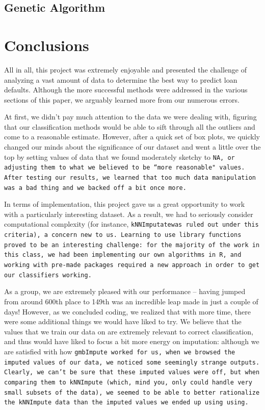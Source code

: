 \documentclass[11pt, oneside]{article}   	%
\begin{document}
	\subsection{Genetic Algorithm}
\section{Conclusions}
	All in all, this project was extremely enjoyable and presented the challenge of analyzing a vast amount of data to determine the best way to predict loan defaults. Although the more successful methods were addressed in the various sections of this paper, we arguably learned more from our numerous errors.
	
	At first, we didn't pay much attention to the data we were dealing with, figuring that our classification methods would be able to sift through all the outliers and come to a reasonable estimate. However, after a quick set of box plots, we quickly changed our minds about the significance of our dataset and went a little over the top by setting values of data that we found moderately sketchy to \tt NA\rm, or adjusting them to what we believed to be ``more reasonable" values. After testing our results, we learned that too much data manipulation was a bad thing and we backed off a bit once more.
	
	
	In terms of implementation, this project gave us a great opportunity to work with a particularly interesting dataset. As a result, we had to seriously consider computational complexity (for instance, \tt kNNImputate\rm was ruled out under this criteria), a concern new to us. Learning to use  library functions proved to be an interesting challenge: for the majority of the work in this class, we had been implementing our own algorithms in R, and working with pre-made packages required a new approach in order to get our classifiers working.
	
		As a group, we are extremely pleased with our performance -- having jumped from around 600th place to 149th was an incredible leap made in just a couple of days! However, as we concluded coding, we realized that with more time, there were some additional things we would have liked to try. We believe that the values that we train our data on are extremely relevant to correct classification, and thus would have liked to focus a bit more energy on imputation: although we are satisfied with how \tt gmbImpute\rm~worked for us, when we browsed the imputed values of our data, we noticed some seemingly strange outputs. Clearly, we can't be sure that these imputed values were off, but when comparing them to \tt kNNImpute\rm~(which, mind you, only could handle very small subsets of the data), we seemed to be able to better rationalize the \tt kNNImpute\rm~data than the imputed values we ended up using using. 
		
\end{document}
